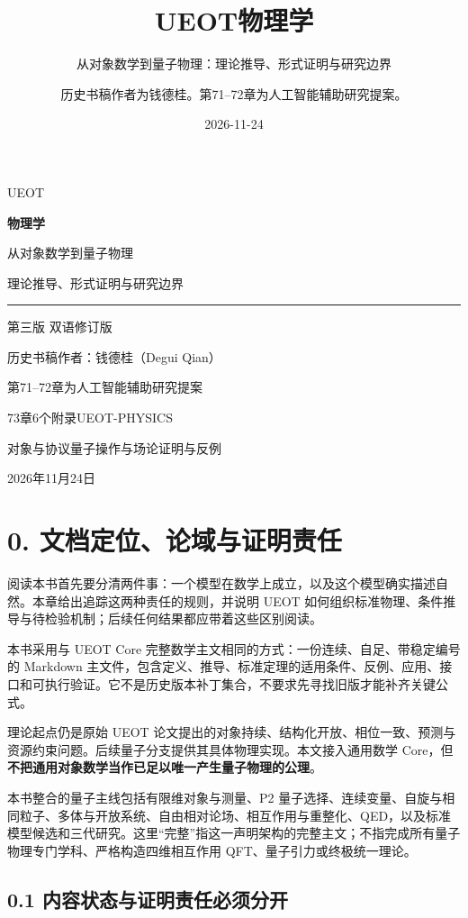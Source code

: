 \documentclass[
  11pt,
  oneside]{book}
\title{UEOT物理学}
\subtitle{从对象数学到量子物理：理论推导、形式证明与研究边界}
\author{历史书稿作者为钱德桂。第71--72章为人工智能辅助研究提案。}
\date{2026-11-24}
\renewcommand{\maketitle}{
  \begin{titlepage}
  \thispagestyle{empty}
  \vspace*{30mm}
  {\color{teal}\fontsize{46}{52}\selectfont UEOT\par}
  \vspace{5mm}
  {\fontsize{32}{40}\selectfont\bfseries 物理学\par}
  \vspace{11mm}
  {\Large 从对象数学到量子物理\par}
  \vspace{4mm}
  {\large 理论推导、形式证明与研究边界\par}
  \vspace{10mm}
  {\color{teal}\rule{\textwidth}{1pt}\par}
  \vspace{7mm}
  {\large 第三版\quad 3.13 双语修订版\par}
  \vspace{6mm}
  {历史书稿作者：钱德桂（Degui Qian）\par}\smallskip
  {第71–72章为人工智能辅助研究提案\par}
  \vspace{5mm}
  {73章\quad 6个附录\quad UEOT-PHYSICS\par}
  \vfill
  {对象与协议\quad 量子操作与场论\quad 证明与反例\par}
  \vspace{7mm}
  {2026年11月24日\par}
  \end{titlepage}
}
\begin{document}
\frontmatter
\maketitle

{
\hypersetup{linkcolor=}
\setcounter{tocdepth}{0}
\tableofcontents
}
\mainmatter
\chapter{0. 文档定位、论域与证明责任}\label{ch-0}\hypertarget{ch-0}{}

阅读本书首先要分清两件事：一个模型在数学上成立，以及这个模型确实描述自然。本章给出追踪这两种责任的规则，并说明
UEOT
如何组织标准物理、条件推导与待检验机制；后续任何结果都应带着这些区别阅读。

本书采用与 UEOT Core
完整数学主文相同的方式：一份连续、自足、带稳定编号的 Markdown
主文件，包含定义、推导、标准定理的适用条件、反例、应用、接口和可执行验证。它不是历史版本补丁集合，不要求先寻找旧版才能补齐关键公式。

理论起点仍是原始 UEOT
论文提出的对象持续、结构化开放、相位一致、预测与资源约束问题。后续量子分支提供其具体物理实现。本文接入通用数学
Core，但\textbf{不把通用对象数学当作已足以唯一产生量子物理的公理}。

本书整合的量子主线包括有限维对象与测量、P2
量子选择、连续变量、自旋与相同粒子、多体与开放系统、自由相对论场、相互作用与重整化、QED，以及标准模型候选和三代研究。这里``完整''指这一声明架构的完整主文；不指完成所有量子物理专门学科、严格构造四维相互作用
QFT、量子引力或终极统一理论。

\section{0.1 内容状态与证明责任必须分开}
\end{document}
